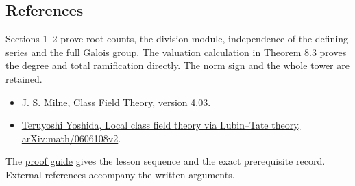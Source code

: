 \documentclass[11pt,a4paper]{article}
\newcommand{\tightlist}{\setlength{\itemsep}{0pt}\setlength{\parskip}{0pt}}
\begin{document}
\subsection{References}\label{references}

Sections 1--2 prove root counts, the division module, independence of
the defining series and the full Galois group. The valuation calculation
in Theorem 8.3 proves the degree and total ramification directly. The
norm sign and the whole tower are retained.

\begin{itemize}
\tightlist
\item
  \href{https://www.jmilne.org/math/CourseNotes/CFT.pdf}{J. S. Milne,
  Class Field Theory, version 4.03}.
\item
  \href{https://arxiv.org/abs/math/0606108v2}{Teruyoshi Yoshida, Local
  class field theory via Lubin--Tate theory, arXiv:math/0606108v2}.
\end{itemize}

The \href{../free-proofs.html}{proof guide} gives the lesson sequence
and the exact prerequisite record. External references accompany the
written arguments.
\end{document}
